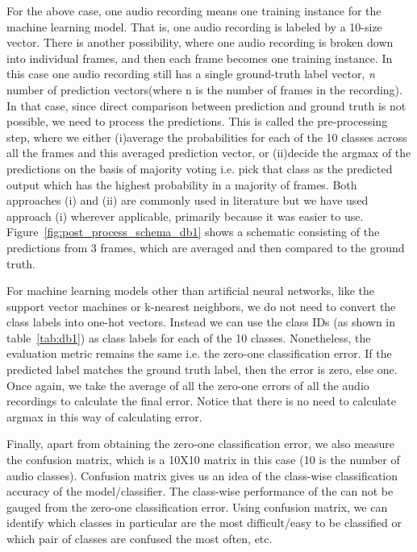 For the above case, one audio recording means one training instance for the machine learning model. That is, one audio recording is labeled by a 10-size vector. There is another possibility, where one audio recording is broken down into individual frames, and then each frame becomes one training instance. In this case one audio recording still has a single ground-truth label vector, \textsl{n} number of prediction vectors(where n is the number of frames in the recording). In that case, since direct comparison between prediction and ground truth is not possible, we need to process the predictions. This is called the pre-processing step, where we either (i)average the probabilities for each of the 10 classes across all the frames and this averaged prediction vector, or (ii)decide the argmax of the predictions on the basis of majority voting i.e. pick that class as the predicted output which has the highest probability in a majority of frames. Both approaches (i) and (ii) are commonly used in literature but we have used approach (i) wherever applicable, primarily because it was easier to use. Figure~\ref{fig:post_process_schema_db1} shows a schematic consisting of the predictions from 3 frames, which are averaged and then compared to the ground truth.

For machine learning models other than artificial neural networks, like the support vector machines or k-nearest neighbors, we do not need to convert the class labels into one-hot vectors. Instead we can use the class IDs (as shown in table~\ref{tab:db1}) as class labels for each of the 10 classes. Nonetheless, the evaluation metric remains the same i.e. the zero-one classification error. If the predicted label matches the ground truth label, then the error is zero, else one. Once again, we take the average of all the zero-one errors of all the audio recordings to calculate the final error. Notice that there is no need to calculate argmax in this way of calculating error.

Finally, apart from obtaining the zero-one classification error, we also measure the confusion matrix, which is a 10X10 matrix in this case (10 is the number of audio classes). Confusion matrix gives us an idea of the class-wise classification accuracy of the model/classifier. The class-wise performance of the can not be gauged from the zero-one classification error. Using confusion matrix, we can identify which classes in particular are the most difficult/easy to be classified or which pair of classes are confused the most often, etc.


